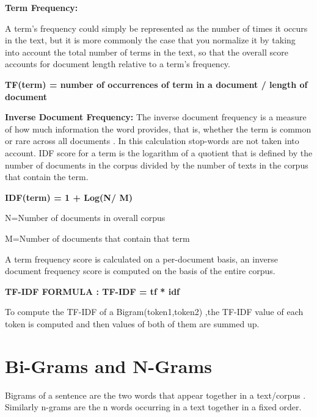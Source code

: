 \documentclass{mnnit}
\begin{document}
\vspace{3 mm}

\noindent \textbf{Term Frequency:}

\noindent A term’s frequency could simply be represented as the number of times it occurs in the text, but it is more commonly the case that you normalize it by taking into account the total number of terms in the text, so that the overall score accounts for document length relative to a term’s frequency.

\vspace{2 mm}

\noindent \textbf{TF(term) = number of occurrences of term in a document / length of document } 

\vspace{2 mm}

\noindent \textbf{Inverse Document Frequency:}
The inverse document frequency is a measure of how much information the word provides, that is, whether the term is common or rare across all documents . In this calculation stop-words are not taken into account. IDF score for a term is the logarithm of a quotient that is defined by the number of documents in the corpus divided by the number of texts in the corpus that contain the term.

         \begin{center}   \textbf{IDF(term) = 1 + Log(N/ M)} \end{center}

\noindent N=Number of documents in overall corpus

\noindent M=Number of documents that contain that term

\noindent A term frequency score is calculated on a per-document basis, an inverse document frequency score is computed on the basis of the entire corpus.

\vspace{2.5 mm}

          \noindent    \textbf{TF-IDF FORMULA  :	TF-IDF = tf * idf }


\noindent To compute the TF-IDF of a Bigram(token1,token2) ,the TF-IDF value of each token is computed and then values of both of them are summed up.
\newpage

\section{Bi-Grams and N-Grams}
Bigrams of a sentence are the two words that appear together in a text/corpus . Similarly n-grams are the n words occurring in a text together in a fixed order\cite{boole}.
\end{document}
